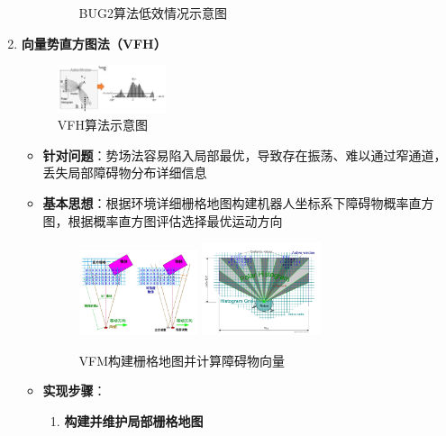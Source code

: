 \documentclass[../main.tex]{subfiles}
\begin{document}
\begin{enumerate}
\begin{enumerate}
\begin{figure}[htbp]
                    \caption{BUG2算法低效情况示意图}
                    \label{fig:bug2bad}
                \end{figure}
        \end{enumerate}
    \item \textbf{向量势直方图法（VFH）}\label{xiangliang}
        \begin{figure}[H]
            \centering
            \includegraphics[width=0.3\textwidth]{images/xiangliang.png}
            \caption{VFH算法示意图}
        \end{figure}    
        \begin{itemize}
            \item \textbf{针对问题}：势场法容易陷入局部最优，导致存在振荡、难以通过窄通道，丢失局部障碍物分布详细信息
            \item \textbf{基本思想}：根据环境详细栅格地图构建机器人坐标系下障碍物概率直方图，根据概率直方图评估选择最优运动方向
                \begin{figure}[htbp]
                    \centering
                    \includegraphics[width=0.35\textwidth]{images/VFM1.png}
                    \includegraphics[width=0.35\textwidth]{images/VFM2.png}
                    \caption{VFM构建栅格地图并计算障碍物向量}
                    \label{fig:bug2bad}
                \end{figure}
            \item \textbf{实现步骤}：
                \begin{enumerate}
                    \item \textbf{构建并维护局部栅格地图}

\end{enumerate}
\end{itemize}
\end{enumerate}
\end{document}
